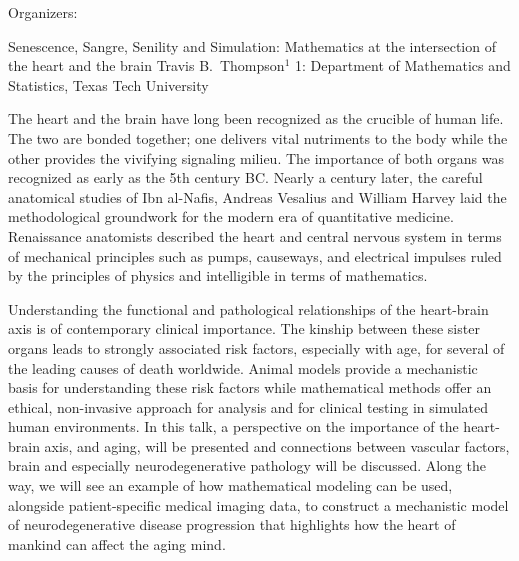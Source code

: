 \label{mini19}

\miniabs
{}
{Organizers: }
{}

\vspace{2ex}
\abs
{Senescence, Sangre, Senility and Simulation: Mathematics at the intersection of the heart and the brain}
{Travis B.~Thompson$^{1}$}
{1: Department of Mathematics and Statistics, Texas Tech University}
{The heart and the brain have long been recognized as the crucible of human life.  The two are bonded together; one delivers vital nutriments to the body while the other provides the vivifying signaling milieu.   The importance of both organs was recognized as early as the 5th century BC.  Nearly a century later, the careful anatomical studies of Ibn al-Nafis, Andreas Vesalius and William Harvey laid the methodological groundwork for the modern era of quantitative medicine.  Renaissance anatomists described the heart and central nervous system in terms of mechanical principles such as pumps, causeways, and electrical impulses ruled by the principles of physics and intelligible in terms of mathematics.   

Understanding the functional and pathological relationships of the heart-brain axis is of contemporary clinical importance.  The kinship between these sister organs leads to strongly associated risk factors, especially with age, for several of the leading causes of death worldwide.  Animal models provide a mechanistic basis for understanding these risk factors while mathematical methods offer an ethical, non-invasive approach for analysis and for clinical testing in simulated human environments.
In this talk, a perspective on the importance of the heart-brain axis, and aging, will be presented and connections between vascular factors, brain and especially neurodegenerative pathology will be discussed.  Along the way, we will see an example of how mathematical modeling can be used, alongside patient-specific medical imaging data, to construct a mechanistic model of neurodegenerative disease progression that highlights how the heart of mankind can affect the aging mind.}


